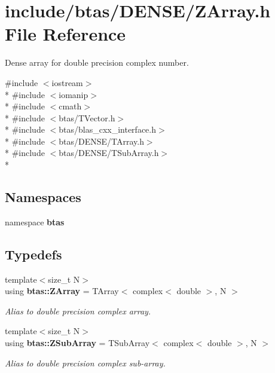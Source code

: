 \section{include/btas/\-D\-E\-N\-S\-E/\-Z\-Array.h File Reference}
\label{d4/dc1/ZArray_8h}


Dense array for double precision complex number.  


{\ttfamily \#include $<$iostream$>$}\\*
{\ttfamily \#include $<$iomanip$>$}\\*
{\ttfamily \#include $<$cmath$>$}\\*
{\ttfamily \#include $<$btas/\-T\-Vector.\-h$>$}\\*
{\ttfamily \#include $<$btas/blas\-\_\-cxx\-\_\-interface.\-h$>$}\\*
{\ttfamily \#include $<$btas/\-D\-E\-N\-S\-E/\-T\-Array.\-h$>$}\\*
{\ttfamily \#include $<$btas/\-D\-E\-N\-S\-E/\-T\-Sub\-Array.\-h$>$}\\*
\subsection*{Namespaces}
\begin{DoxyCompactItemize}
\item 
namespace {\bf btas}
\end{DoxyCompactItemize}
\subsection*{Typedefs}
\begin{DoxyCompactItemize}
\item 
{\footnotesize template$<$size\-\_\-t N$>$ }\\using {\bf btas\-::\-Z\-Array} = T\-Array$<$ complex$<$ double $>$, N $>$
\begin{DoxyCompactList}\small\item\em Alias to double precision complex array. \end{DoxyCompactList}\item 
{\footnotesize template$<$size\-\_\-t N$>$ }\\using {\bf btas\-::\-Z\-Sub\-Array} = T\-Sub\-Array$<$ complex$<$ double $>$, N $>$
\begin{DoxyCompactList}\small\item\em Alias to double precision complex sub-\/array. \end{DoxyCompactList}\end{DoxyCompactItemize}
